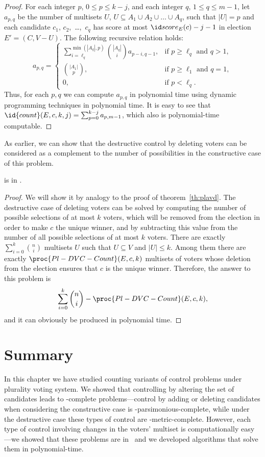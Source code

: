 \begin{proof}
For each integer $p$, $0\le p\le k-j$, and each integer $q$, $1\le q\le m-1$, let $a_{p,q}$ be the number of multisets $U$, $U\subseteq A_1\cup A_2\cup\dots\cup A_q$, such that $|U|=p$ and each candidate $c_1$, $c_2$,~\dots,~$c_q$ has score at most $\score{E}(c)-j-1$ in election $E'=(C,V-U)$.
The following recursive relation holds:
\[
	a_{p,q} =
	\begin{cases}
		\sum_{i=\ell_q}^{\min(|A_q|,p)}\!\binom{|A_q|}{i}a_{p-i,q-1}, & \text{if $p\ge\ell_q$ and $q>1$}, \\[2mm]
		\binom{|A_1|}{p}, & \text{if $p\ge\ell_1$ and $q=1$}, \\[1mm]
		0, & \text{if $p<\ell_q$}.
	\end{cases}
\]
Thus, for each $p,q$ we can compute $a_{p,q}$ in polynomial time using dynamic programming techniques in polynomial time.
It is easy to see that $\id{count}(E,c,k,j)=\sum_{p=0}^{k-j}a_{p,m-1}$, which also is polynomial-time computable.
\end{proof}

As earlier, we can show that the destructive control by deleting voters can be considered as a complement to the number of possibilities in the constructive case of this problem.

\begin{theorem} \label{th:pldvd}
	 is in \FPclass.
\end{theorem}

\begin{proof}
We will show it by analogy to the proof of theorem~\ref{th:plavd}.
The destructive case of deleting voters can be solved by computing the number of possible selections of at most $k$ voters, which will be removed from the election in order to make $c$ the unique winner, and by subtracting this value from the number of all possible selections of at most $k$ voters.
There are exactly $\sum_{i=0}^k\binom{n}{i}$ multisets $U$ such that $U\subseteq V$ and $|U|\le k$.
Among them there are exactly $\proc{Pl-DVC-Count}(E,c,k)$ multisets of voters whose deletion from the election ensures that $c$ is the unique winner.
Therefore, the answer to this problem is
\[
    \sum_{i=0}^k\binom{n}{i}-\proc{Pl-DVC-Count}(E,c,k),
\]
and it can obviously be produced in polynomial time.
\end{proof}

\section{Summary} \label{sec:plsum}

In this chapter we have studied counting variants of control problems under plu\-ra\-li\-ty voting system.
We showed that controlling by altering the set of candidates leads to \sharpPclass-complete problems---control by adding or deleting candidates when considering the constructive case is \sharpPclass-parsimonious-complete, while under the destructive case these types of control are \sharpPclass-metric-complete.
However, each type of control involving changes in the voters' multiset is computationally easy---we showed that these problems are in \FPclass\ and we developed algorithms that solve them in polynomial-time.
